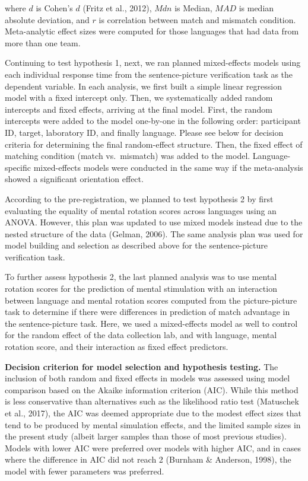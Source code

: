 \documentclass[
  man,floatsintext]{apa7}
\begin{document}
where \(d\) is Cohen's \(d\) (Fritz et al., 2012), \(Mdn\) is Median, \(MAD\) is median
absolute deviation, and \(r\) is correlation between match and mismatch
condition. Meta-analytic effect sizes were computed for those languages
that had data from more than one team.

Continuing to test hypothesis 1, next, we ran planned mixed-effects
models using each individual response time from the sentence-picture
verification task as the dependent variable. In each analysis, we first
built a simple linear regression model with a fixed intercept only.
Then, we systematically added random intercepts and fixed effects,
arriving at the final model. First, the random intercepts were added to
the model one-by-one in the following order: participant ID, target,
laboratory ID, and finally language. Please see below for decision
criteria for determining the final random-effect structure. Then, the
fixed effect of matching condition (match vs.~mismatch) was added to the
model. Language-specific mixed-effects models were conducted in the same
way if the meta-analysis showed a significant orientation effect.

According to the pre-registration, we planned to test hypothesis 2 by
first evaluating the equality of mental rotation scores across languages
using an ANOVA. However, this plan was updated to use mixed models
instead due to the nested structure of the data (Gelman, 2006). The same
analysis plan was used for model building and selection as described
above for the sentence-picture verification task.

To further assess hypothesis 2, the last planned analysis was to use
mental rotation scores for the prediction of mental stimulation with an
interaction between language and mental rotation scores computed from
the picture-picture task to determine if there were differences in
prediction of match advantage in the sentence-picture task. Here, we
used a mixed-effects model as well to control for the random effect of
the data collection lab, and with language, mental rotation score, and
their interaction as fixed effect predictors.

\textbf{Decision criterion for model selection and hypothesis testing.} The
inclusion of both random and fixed effects in models was assessed using
model comparison based on the Akaike information criterion (AIC). While
this method is less conservative than alternatives such as the
likelihood ratio test (Matuschek et al., 2017), the AIC was deemed appropriate
due to the modest effect sizes that tend to be produced by mental
simulation effects, and the limited sample sizes in the present study
(albeit larger samples than those of most previous studies). Models with
lower AIC were preferred over models with higher AIC, and in cases where
the difference in AIC did not reach 2 (Burnham \& Anderson, 1998), the model with
fewer parameters was preferred.
\end{document}
